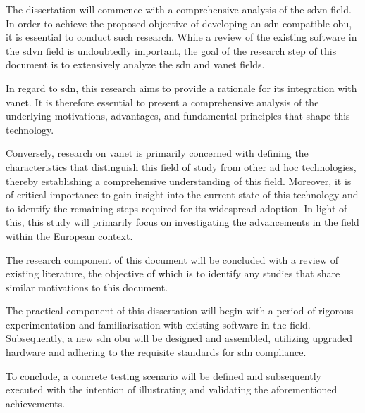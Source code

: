 The dissertation will commence with a comprehensive analysis of the \gls{sdvn} field. In order to achieve the proposed objective of developing an \gls{sdn}-compatible \gls{obu}, it is essential to conduct such research. While a review of the existing software in the \gls{sdvn} field is undoubtedly important, the goal of the research step of this document is to extensively analyze the \gls{sdn} and \gls{vanet} fields.

In regard to \gls{sdn}, this research aims to provide a rationale for its integration with \gls{vanet}. It is therefore essential to present a comprehensive analysis of the underlying motivations, advantages, and fundamental principles that shape this technology.

Conversely, research on \gls{vanet} is primarily concerned with defining the characteristics that distinguish this field of study from other ad hoc technologies, thereby establishing a comprehensive understanding of this field. Moreover, it is of critical importance to gain insight into the current state of this technology and to identify the remaining steps required for its widespread adoption. In light of this, this study will primarily focus on investigating the advancements in the field within the European context.

The research component of this document will be concluded with a review of existing literature, the objective of which is to identify any studies that share similar motivations to this document.

The practical component of this dissertation will begin with a period of rigorous experimentation and familiarization with existing software in the field. Subsequently, a new \gls{sdn} \gls{obu} will be designed and assembled, utilizing upgraded hardware and adhering to the requisite standards for \gls{sdn} compliance.

To conclude, a concrete testing scenario will be defined and subsequently executed with the intention of illustrating and validating the aforementioned achievements.


